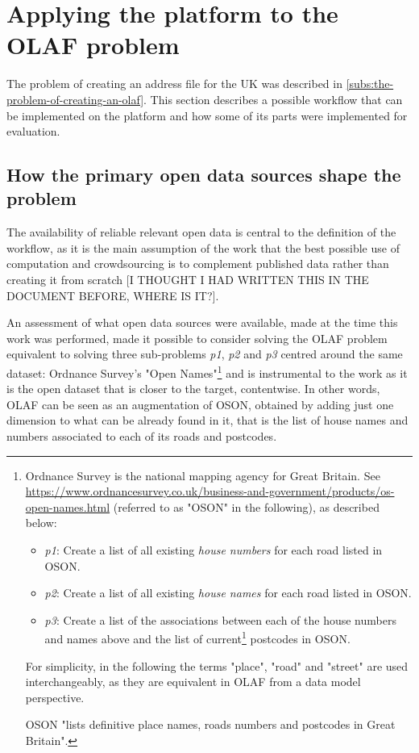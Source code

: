 \section{Applying the platform to the OLAF problem}

The problem of creating an address file for the UK was described in \ref{subs:the-problem-of-creating-an-olaf}. This section describes a possible workflow that can be implemented on the platform and how some of its parts were implemented for evaluation.

\subsection{How the primary open data sources shape the problem}

The availability of reliable relevant open data is central to the definition of the workflow, as it is the main assumption of the work that the best possible use of computation and crowdsourcing is to complement published data rather than creating it from scratch [I THOUGHT I HAD WRITTEN THIS IN THE DOCUMENT BEFORE, WHERE IS IT?]. 

An assessment of what open data sources were available, made at the time this work was performed, made it possible to consider solving the OLAF problem equivalent to solving three sub-problems {\it p1}, {\it p2} and {\it p3} centred around the same dataset: Ordnance Survey's "Open Names"\footnote{Ordnance Survey is the national mapping agency for Great Britain. See \url{https://www.ordnancesurvey.co.uk/business-and-government/products/os-open-names.html} (referred to as "OSON" in the following), as described below:

\begin{itemize}
    \item {\it p1}: Create a list of all existing {\it house numbers} for each road listed in OSON.
    \item {\it p2}: Create a list of all existing {\it house names} for each road listed in OSON.
    \item {\it p3}: Create a list of the associations between each of the house numbers and names above and the list of current\footnote{Postcodes can change. The problem of documenting how addresses change postcode in time is relevant but outside of the scope of research.} postcodes in OSON. 
\end{itemize}

For simplicity, in the following the terms "place", "road" and "street" are used interchangeably, as they are equivalent in OLAF from a data model perspective.

OSON "lists definitive place names, roads numbers and postcodes in Great Britain".} and is instrumental to the work as it is the open dataset that is closer to the target, contentwise. In other words, OLAF can be seen as an augmentation of OSON, obtained by adding just one dimension to what can be already found in it, that is the list of house names and numbers associated to each of its roads and postcodes. 
    
